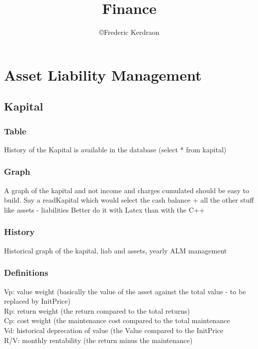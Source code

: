 \documentclass[8pt]{article} %
\title{Finance}
\author{\copyright Frederic Kerdraon}
\begin{document}
\maketitle
\tableofcontents

\section{Asset Liability Management}

\subsection{Kapital}

\subsubsection{Table}
History of the Kapital is available in the database (select * from kapital)


\subsubsection{Graph}
A graph of the kapital and not income and charges cumulated should be easy to build.
Say a readKapital which would select the cash balance + all the other stuff like assets - liabilities
Better do it with Latex than with the C++ 

\subsubsection{History}
{\footnotesize
Historical graph of the kapital, liab and assets, yearly ALM management\\
}

\subsubsection{Definitions}
{\footnotesize
Vp: value weight (basically the value of the asset against the total value - to be replaced by InitPrice)\\
Rp: return weight (the return compared to the total returns)\\
Cp: cost weight (the maintenance cost compared to the total maintenance\\
Vd: historical deprecation of value (the Value compared to the InitPrice\\
R/V: monthly rentability (the return minus the maintenance)\\}
\end{document}
